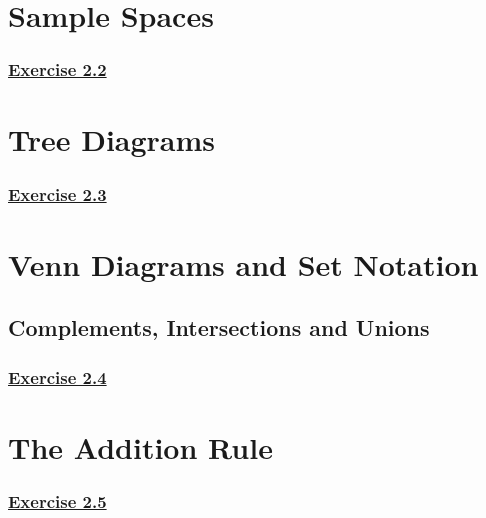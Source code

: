 \documentclass[
  11pt,
]{book}
\begin{document}
\section{Sample Spaces}\label{sample-spaces}

\subsubsection*{\texorpdfstring{\hyperref[ex22a]{Exercise 2.2}}{Exercise 2.2}}\label{exercise-2.2}

\section{Tree Diagrams}\label{tree-diagrams}

\subsubsection*{\texorpdfstring{\hyperref[ex23a]{Exercise 2.3}}{Exercise 2.3}}\label{exercise-2.3}

\section{Venn Diagrams and Set Notation}\label{venn-diagrams-and-set-notation}

\subsection*{Complements, Intersections and Unions}\label{complements-intersections-and-unions}

\subsubsection*{\texorpdfstring{\hyperref[ex24a]{Exercise 2.4}}{Exercise 2.4}}\label{exercise-2.4}

\section{The Addition Rule}\label{the-addition-rule}

\subsubsection*{\texorpdfstring{\hyperref[ex25a]{Exercise 2.5}}{Exercise 2.5}}\label{exercise-2.5}
\end{document}

